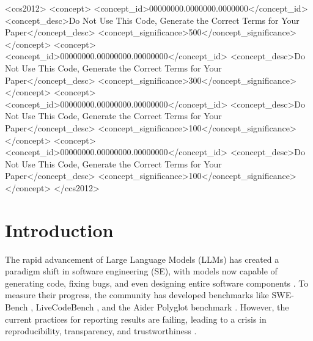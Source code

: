 \documentclass[sigconf,review]{acmart}
\begin{document}
\begin{CCSXML}
<ccs2012>
 <concept>
  <concept_id>00000000.0000000.0000000</concept_id>
  <concept_desc>Do Not Use This Code, Generate the Correct Terms for Your Paper</concept_desc>
  <concept_significance>500</concept_significance>
 </concept>
 <concept>
  <concept_id>00000000.00000000.00000000</concept_id>
  <concept_desc>Do Not Use This Code, Generate the Correct Terms for Your Paper</concept_desc>
  <concept_significance>300</concept_significance>
 </concept>
 <concept>
  <concept_id>00000000.00000000.00000000</concept_id>
  <concept_desc>Do Not Use This Code, Generate the Correct Terms for Your Paper</concept_desc>
  <concept_significance>100</concept_significance>
 </concept>
 <concept>
  <concept_id>00000000.00000000.00000000</concept_id>
  <concept_desc>Do Not Use This Code, Generate the Correct Terms for Your Paper</concept_desc>
  <concept_significance>100</concept_significance>
 </concept>
</ccs2012>
\end{CCSXML}





\section{Introduction}
The rapid advancement of Large Language Models (LLMs) has created a paradigm shift in software engineering (SE), with models now capable of generating code, fixing bugs, and even designing entire software components \cite{hou2023large}. To measure their progress, the community has developed benchmarks like SWE-Bench \cite{jimenez2024swebench}, LiveCodeBench \cite{zhang2024livecodebench}, and the Aider Polyglot benchmark \cite{goth2024polyglot}. However, the current practices for reporting results are failing, leading to a crisis in reproducibility, transparency, and trustworthiness \cite{li2023reproducibility}.
\end{document}
